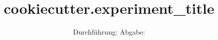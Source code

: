 

\subject{ {{cookiecutter.experiment_number}} }
\title{ {{cookiecutter.experiment_title}} }
\date{
  Durchführung: 
  \hspace{1em}
  Abgabe: 
}



\maketitle
\thispagestyle{empty}
\tableofcontents
\newpage






\printbibliography


